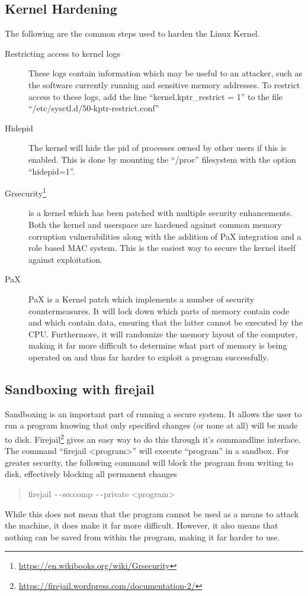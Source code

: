 \documentclass[a4paper,11pt]{report}
\begin{document}
			\subsection{Kernel Hardening}
				The following are the common steps used to harden the Linux Kernel. 
				\begin{description}
					\item[Restricting access to kernel logs]
						These logs contain information which may be useful to an attacker, such as the software currently running and sensitive memory addresses. 
						To restrict access to these logs, add the line ``kernel.kptr\_restrict = 1'' to the file ``/etc/sysctl.d/50-kptr-restrict.conf''
					\item[Hidepid] 
						The kernel will hide the pid of processes owned by other users if this is enabled. This is done by mounting the ``/proc'' filesystem with the option ``hidepid=1''. 
					\item[Grsecurity\footnote{\url{https://en.wikibooks.org/wiki/Grsecurity}}]
						is a kernel which has been patched with multiple security enhancements. 
						Both the kernel and userspace are hardened against common memory corruption vulnerabilities along with the addition of PaX integration and a role based MAC system. This is the easiest way to secure the kernel itself against exploitation. 
					\item[PaX] PaX is a Kernel patch which implements a number of security countermeasures. 
						It will lock down which parts of memory contain code and which contain data, ensuring that the latter cannot be executed by the CPU. 
						Furthermore, it will randomize the memory layout of the computer, making it far more difficult to determine what part of memory is being operated on and thus far harder to exploit a program successfully. 
				\end{description}
				\subsection{Sandboxing with firejail}
					Sandboxing is an important part of running a secure system. 
					It allows the user to run a program knowing that only specified changes (or none at all) will be made to disk. 
					Firejail\footnote{\url{https://firejail.wordpress.com/documentation-2/}} gives an easy way to do this through it's commandline interface. 
					The command ``firejail <program>'' will execute ``program'' in a sandbox. 
					For greater security, the following command will block the program from writing to disk, effectively blocking all permanent changes
					\begin{quote}
						firejail \verb+--+seccomp \verb+--+private <program>
					\end{quote}
					While this does not mean that the program cannot be used as a means to attack the machine, it does make it far more difficult. 
					However, it also means that nothing can be saved from within the program, making it far harder to use. 
\end{document}
